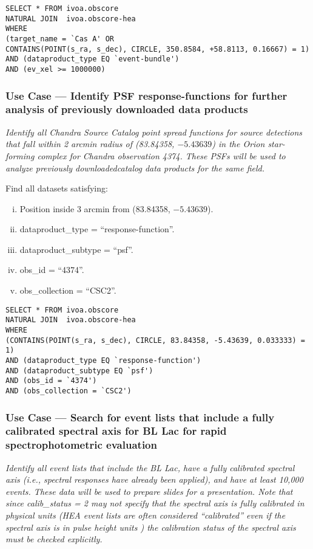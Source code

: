 \begin{verbatim}
SELECT * FROM ivoa.obscore
NATURAL JOIN  ivoa.obscore-hea 
WHERE
(target_name = `Cas A' OR
CONTAINS(POINT(s_ra, s_dec), CIRCLE, 350.8584, +58.8113, 0.16667) = 1) 
AND (dataproduct_type EQ `event-bundle')
AND (ev_xel >= 1000000)
\end{verbatim}


\subsubsection{Use Case --- Identify PSF response-functions for further analysis of previously downloaded data products}

{\em Identify all Chandra Source Catalog point spread functions for source detections that fall within 2 arcmin radius of  (83.84358, $-5.43639$) in the Orion star-forming complex for Chandra observation 4374.  These PSFs will be used to analyze previously downloadedcatalog data products for the same field.\/ }

\medskip
\noindent Find all datasets satisfying:
\begin{enumerate}[(i)]
  \item Position inside 3 arcmin from (83.84358, $-5.43639$).
  \item dataproduct\_type = ``response-function''.
  \item dataproduct\_subtype = ``psf''.
  \item obs\_id = ``4374''.
  \item obs\_collection = ``CSC2''.
\end{enumerate}

\begin{verbatim}
SELECT * FROM ivoa.obscore
NATURAL JOIN  ivoa.obscore-hea 
WHERE
(CONTAINS(POINT(s_ra, s_dec), CIRCLE, 83.84358, -5.43639, 0.033333) = 1) 
AND (dataproduct_type EQ `response-function')
AND (dataproduct_subtype EQ `psf')
AND (obs_id = `4374')
AND (obs_collection = `CSC2')
\end{verbatim}


\subsubsection{Use Case --- Search for event lists that include a fully calibrated spectral axis for BL Lac for rapid spectrophotometric evaluation}

{\em Identify all event lists that include the BL Lac, have a fully calibrated spectral axis (i.e., spectral responses have already been applied), and have at least 10,000 events.  These data will be used to prepare slides for a presentation.  Note that since calib\_status = 2 may not specify that the spectral axis is fully calibrated in physical units (HEA event lists are often considered ``calibrated'' even if the spectral axis is in pulse height units ) the calibration status of the spectral axis must be checked explicitly.\/}


